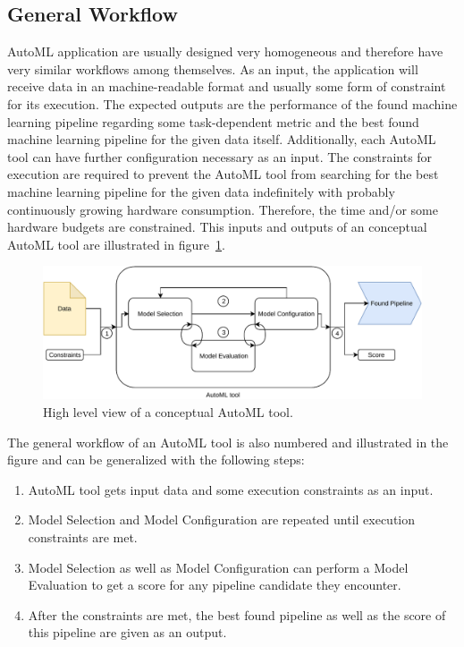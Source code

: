 \subsection{General Workflow}
\label{sec:theory:automl:workflow}
AutoML application are usually designed very homogeneous and therefore have very similar workflows among themselves.
As an input, the application will receive data in an machine-readable format and usually some form of constraint for its execution.
The expected outputs are the performance of the found machine learning pipeline regarding some task-dependent metric and the best found machine learning pipeline for the given data itself.
Additionally, each AutoML tool can have further configuration necessary as an input.\newline
The constraints for execution are required to prevent the AutoML tool from searching for the best machine learning pipeline for the given data indefinitely with probably continuously growing hardware consumption.
Therefore, the time and/or some hardware budgets are constrained.
This inputs and outputs of an conceptual AutoML tool are illustrated in figure~\ref{fig:theory:conceptualAutoMLTool}.\newline
\begin{figure}[ht!]
    \centering
    \includegraphics[width=\textwidth]{gfx/Figures/Theory/AutoMLTool.pdf}
    \caption{High level view of a conceptual AutoML tool. }
	\label{fig:theory:conceptualAutoMLTool}
\end{figure}
The general workflow of an AutoML tool is also numbered and illustrated in the figure and can be generalized with the following steps:
\begin{enumerate}
    \item AutoML tool gets input data and some execution constraints as an input.
    \item Model Selection and Model Configuration are repeated until execution constraints are met.
    \item Model Selection as well as Model Configuration can perform a Model Evaluation to get a score for any pipeline candidate they encounter.
    \item After the constraints are met, the best found pipeline as well as the score of this pipeline are given as an output.
\end{enumerate}
